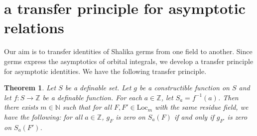 \documentclass[12pt]{amsart}
\newcommand{\ring}[1]{{\mathbb #1}}
\newcommand{\Loc}{\mathrm{Loc}}
\theoremstyle{plain}
\newtheorem{theorem}[thm]{Theorem}
\theoremstyle{definition}
\begin{document}
\section{a transfer principle for asymptotic relations}

Our aim is to transfer identities of Shalika germs from
one field to another.  Since germs express the asymptotics of
orbital integrals, we develop a transfer principle for
asymptotic identities.  We have the following transfer principle.

\begin{theorem} 
Let $S$ be a definable set.    
Let $g$ be a constructible function on $S$ and let
  $f:S\to \ring{Z}$ be a definable function.  For each $a\in\ring{Z}$,
let $S_a = f^{-1}(a)$.  Then there exists 
  $m\in\ring{N}$ such that for all $F,F'\in\Loc_m$ with the same
  residue field, we have the following: for all $a\in\ring{Z}$, 
  $g_F$ is zero on $S_a(F)$ if and only if $g_{F'}$ is zero
  on $S_a(F')$.
\end{theorem}
\end{document}
